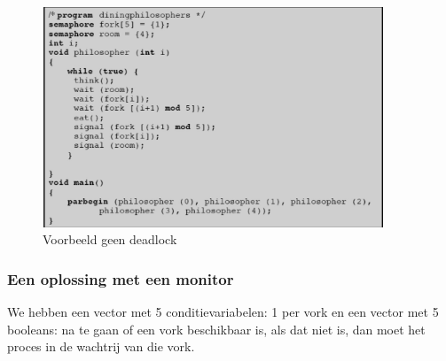  \begin{figure}[htp]
    \centering
            \includegraphics[width=4in]{img/oplossingsemafoor2.jpg}
        \caption{Voorbeeld geen deadlock}
    \label{fig:Voorbeeld geen deadlock}
\end{figure}

\subsubsection{Een oplossing met een monitor}
We hebben een vector met 5 conditievariabelen: 1 per vork en een vector met 5 booleans: na te gaan of een vork beschikbaar is, als dat niet is, dan moet het proces in de wachtrij van die vork.